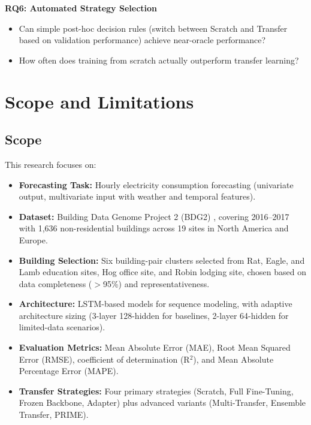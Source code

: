 \documentclass[12pt,a4paper]{report}
\begin{document}
\textbf{RQ6: Automated Strategy Selection}
\begin{itemize}
    \item Can simple post-hoc decision rules (switch between Scratch and Transfer based on validation performance) achieve near-oracle performance?
    \item How often does training from scratch actually outperform transfer learning?
\end{itemize}

\section{Scope and Limitations}

\subsection{Scope}

This research focuses on:

\begin{itemize}
    \item \textbf{Forecasting Task:} Hourly electricity consumption forecasting (univariate output, multivariate input with weather and temporal features).
    
    \item \textbf{Dataset:} Building Data Genome Project 2 (BDG2) \cite{miller2020building}, covering 2016--2017 with 1,636 non-residential buildings across 19 sites in North America and Europe.
    
    \item \textbf{Building Selection:} Six building-pair clusters selected from Rat, Eagle, and Lamb education sites, Hog office site, and Robin lodging site, chosen based on data completeness ($>$95\%) and representativeness.
    
    \item \textbf{Architecture:} LSTM-based models for sequence modeling, with adaptive architecture sizing (3-layer 128-hidden for baselines, 2-layer 64-hidden for limited-data scenarios).
    
    \item \textbf{Evaluation Metrics:} Mean Absolute Error (MAE), Root Mean Squared Error (RMSE), coefficient of determination (R$^2$), and Mean Absolute Percentage Error (MAPE).
    
    \item \textbf{Transfer Strategies:} Four primary strategies (Scratch, Full Fine-Tuning, Frozen Backbone, Adapter) plus advanced variants (Multi-Transfer, Ensemble Transfer, PRIME).
\end{itemize}
\end{document}
